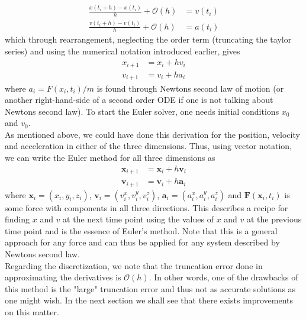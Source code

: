 \documentclass[12pt]{article}
\numberwithin{figure}{section}
\numberwithin{table}{section}
\begin{document}
\begin{align}
	\frac{x(t_i+h)-x(t_i)}{h}+\mathcal{O}(h)&=v(t_i) \label{eq:euler_x} \\[0.20cm]
    \frac{v(t_i+h)-v(t_i)}{h}+\mathcal{O}(h)&=a(t_i) \label{eq:euler_v}
\end{align}
which through rearrangement, neglecting the order term (truncating the taylor series) and using the numerical notation introduced earlier, gives
\begin{align}
	x_{i+1}&=x_i+hv_i \label{eq:euler_x_2} \\
    v_{i+1}&=v_i+ha_i \label{eq:euler_v_2}
\end{align}
where $a_i=F(x_i,t_i)/m$ is found through Newtons second law of motion (or another right-hand-side of a second order ODE if one is not talking about Newtons second law). To start the Euler solver, one needs initial conditions $x_0$ and $v_0$. \\

\noindent As mentioned above, we could have done this derivation for the position, velocity and acceleration in either of the three dimensions. Thus, using vector notation, we can write the Euler method for all three dimensions as
\begin{align}
	\mathbf{x}_{i+1}&=\mathbf{x}_i+h\mathbf{v}_i \label{eq:euler_x_3D} \\
    \mathbf{v}_{i+1}&=\mathbf{v}_i+h\mathbf{a}_i \label{eq:euler_v_3D}
\end{align}
where $\mathbf{x}_i=(x_i,y_i,z_i)$, $\mathbf{v}_i=(v_i^x,v_i^y,v_i^z)$, $\mathbf{a}_i=(a_i^x,a_i^y,a_i^z)$ and $\mathbf{F}(\mathbf{x}_i,t_i)$ is some force with components in all three directions. This describes a recipe for finding $x$ and $v$ at the next time point using the values of $x$ and $v$ at the previous time point and is the essence of Euler's method. Note that this is a general approach for any force and can thus be applied for any system described by Newtons second law. \\

\noindent Regarding the discretization, we note that the truncation error done in approximating the derivatives is $\mathcal{O}(h)$. In other words, one of the drawbacks of this method is the "large" truncation error and thus not as accurate solutions as one might wish. In the next section we shall see that there exists improvements on this matter.


\end{document}
